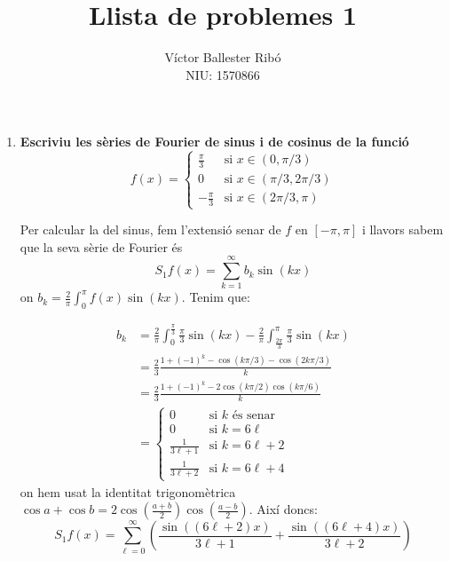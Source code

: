 \documentclass[10pt,a4paper]{article}
\title{\bfseries\Large Llista de problemes 1}
\author{Víctor Ballester Ribó\\NIU: 1570866}
\date{\parbox{\linewidth}{\centering
  Anàlisi Harmònica\endgraf
  Grau en Matemàtiques\endgraf
  Universitat Autònoma de Barcelona\endgraf
  Febrer de 2023}}
\theoremstyle{definition}
\begin{document}
\maketitle

\begin{enumerate}
  \item \textbf{Escriviu les sèries de Fourier de sinus i de cosinus de la funció}
        \begin{equation*}
          f(x)=\begin{cases}
            \frac{\pi}{3}  & \text{si } x\in(0,\pi/3)      \\
            0              & \text{si } x\in(\pi/3,2\pi/3) \\
            -\frac{\pi}{3} & \text{si } x\in(2\pi/3,\pi)
          \end{cases}
        \end{equation*}

        Per calcular la del sinus, fem l'extensió senar de $f$ en $[-\pi,\pi]$ i llavors sabem que la seva sèrie de Fourier és $$S_1f(x)=\sum_{k=1}^{\infty}b_k\sin(kx)$$ on $b_k=\frac{2}{\pi}\int_0^\pi f(x)\sin(kx)$. Tenim que:

        \begin{align*}
          b_k & =\frac{2}{\pi}\int_0^{\frac{\pi}{3}} \frac{\pi}{3}\sin(kx)-\frac{2}{\pi}\int_{\frac{2\pi}{3}}^{\pi} \frac{\pi}{3}\sin(kx) \\
              & =\frac{2}{3}\frac{1+{(-1)}^k-\cos(k\pi/3)-\cos(2k\pi/3)}{k}                                                               \\
              & =\frac{2}{3}\frac{1+{(-1)}^k-2\cos(k\pi/2)\cos(k\pi/6)}{k}                                                                \\
              & =\begin{cases}
                   0                                & \text{si $k$ és senar}  \\
                   0                                & \text{si $k=6\ell$}     \\
                   \displaystyle\frac{1}{3\ell + 1} & \text{si $k=6\ell + 2$} \\
                   \displaystyle\frac{1}{3\ell + 2} & \text{si $k=6\ell + 4$}
                 \end{cases}
        \end{align*}
        on hem usat la identitat trigonomètrica $\cos a+\cos b=2\cos\left(\frac{a+b}{2}\right)\cos\left(\frac{a-b}{2}\right)$. Així doncs: $$S_1f(x)=\sum_{\ell = 0}^\infty\left(\frac{\sin((6\ell + 2)x)}{3\ell + 1} + \frac{\sin((6\ell + 4)x)}{3\ell + 2} \right)$$


\end{enumerate}
\end{document}
